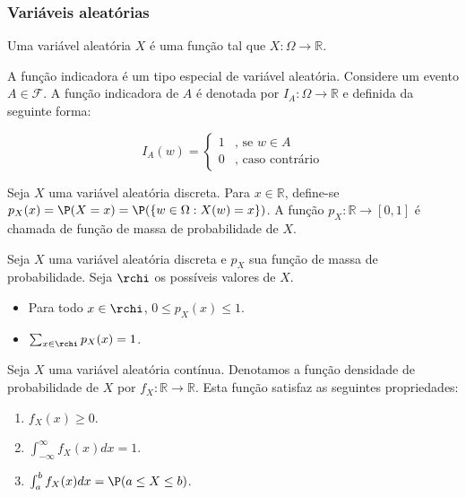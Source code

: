 \subsubsection{Variáveis aleatórias}

\begin{definition}
 \label{defn:random_variable}
 Uma variável aleatória $X$ é uma função tal que $X: \Omega \rightarrow \mathbb{R}$.
\end{definition}

\begin{definition}
 \label{indicator_function}
 A função indicadora é um tipo especial de variável aleatória.
 Considere um evento $A \in \mathcal{F}$. 
 A função indicadora de $A$ é denotada por $I_{A}: \Omega \rightarrow \mathbb{R}$ e definida da seguinte forma:
 
 \[ I_{A}(w) = 
    \begin{cases}
		 1 & \mbox{, se $w \in A$}	\\
		 0 & \mbox{, caso contrário}
    \end{cases}
 \]
\end{definition}

\begin{definition}
 \label{pmf}
 Seja $X$ uma variável aleatória discreta. 
 Para $x \in \mathbb{R}$, define-se $p_{X}(x) = \P(X = x) = \P(\{w \in \Omega: X(w) = x\})$. 
 A função $p_{X}: \mathbb{R} \rightarrow [0,1]$ é chamada de função de massa de probabilidade de $X$.
\end{definition}

\begin{lemma}
 \label{pmf_prop}
 Seja $X$ uma variável aleatória discreta e $p_{X}$ sua função de massa de probabilidade. 
 Seja $\rchi$ os possíveis valores de $X$.
 \begin{itemize}
  \item Para todo $x \in \rchi$, $0 \leq p_{X}(x) \leq 1$.
  \item $\sum_{x \in \rchi}{p_{X}(x)} = 1$.
 \end{itemize}
\end{lemma}

\begin{definition}
 \label{pdf}
 Seja $X$ uma variável aleatória contínua. 
 Denotamos a função densidade de probabilidade de $X$ 
 por $f_{X}: \mathbb{R} \rightarrow \mathbb{R}$. 
 Esta função satisfaz as seguintes propriedades:      
 \begin{enumerate}
	\item $f_{X}(x) \geq 0$.
	\item $\int_{-\infty}^{\infty}{f_{X}(x)dx} = 1$.
	\item $\int_{a}^{b}{f_{X}(x)dx} = \P(a \leq X \leq b)$.
 \end{enumerate}
\end{definition}

